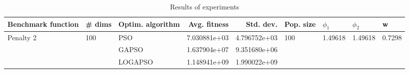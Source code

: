 \begin{table}
\centering
\caption{Results of experiments}
\begin{tabular}{lllrrllll}
\toprule
        Benchmark function &              \# dims & Optim. algorithm &  Avg. fitness &    Std. dev. &            Pop. size &               $\phi_{1}$ &               $\phi_{2}$ &                       w \\
\midrule
\multirow{3}{*}{Penalty 2} & \multirow{3}{*}{100} &              PSO &  7.030881e+03 & 4.796752e+03 & \multirow{3}{*}{100} & \multirow{3}{*}{1.49618} & \multirow{3}{*}{1.49618} & \multirow{3}{*}{0.7298} \\
                           &                      &            GAPSO &  1.637904e+07 & 9.351680e+06 &                      &                          &                          &                         \\
                           &                      &          LOGAPSO &  1.148941e+09 & 1.990022e+09 &                      &                          &                          &                         \\
\bottomrule
\end{tabular}
\end{table}

